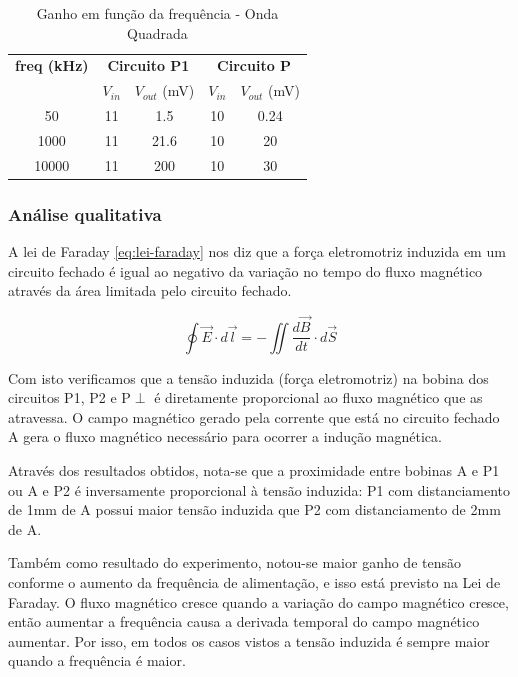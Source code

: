 \documentclass[12pt]{article}
\begin{document}
\begin{table}[htbp]
  \centering
  \begin{tabular}{c|cc|cc}
    \toprule
    \textbf{freq (kHz)} & \multicolumn{2}{c|}{\textbf{Circuito P1}} &
    \multicolumn{2}{c}{\textbf{Circuito P}} \\
    & $V_{in}$ & $V_{out}$ (mV) & $V_{in}$ & $V_{out}$ (mV) \\
    \midrule
    50      & 11   & 1.5   & 10 & 0.24 \\
    1000    & 11   & 21.6  & 10 & 20   \\
    10000   & 11   & 200   & 10 & 30   \\
    \bottomrule
  \end{tabular}
  \caption{Ganho em função da frequência - Onda Quadrada}
  \label{tab:ganho-onda-quadrada}
\end{table}

\subsubsection{Análise qualitativa}
A lei de Faraday \ref{eq:lei-faraday} nos diz que a força
eletromotriz induzida em um circuito
fechado é igual ao negativo da variação no tempo do fluxo magnético através da
área limitada pelo circuito fechado.

\begin{equation}
  \label{eq:lei-faraday}
  \oint \vec{E} \cdot d\vec{l} = -\iint \frac{d\vec{B}}{dt}   \cdot d\vec{S}
\end{equation}

Com isto verificamos que a tensão induzida (força eletromotriz) na
bobina dos circuitos P1, P2 e P$\perp$ é diretamente proporcional ao  fluxo
magnético que as atravessa. O campo magnético gerado pela corrente
que está no circuito fechado A gera o fluxo magnético necessário para
ocorrer a indução magnética.

Através dos resultados obtidos, nota-se que a proximidade entre
bobinas A e P1 ou A e P2 é inversamente proporcional à tensão
induzida: P1 com distanciamento de 1mm de A possui maior tensão
induzida que P2 com distanciamento de 2mm de A.

Também como resultado do experimento, notou-se maior ganho de tensão
conforme o aumento da frequência de alimentação, e isso está previsto
na Lei de Faraday. O fluxo magnético cresce quando a variação do
campo magnético cresce, então aumentar a frequência causa a derivada
temporal do campo magnético aumentar. Por isso, em todos os casos
vistos a tensão induzida é sempre maior quando a frequência é maior.
\end{document}
